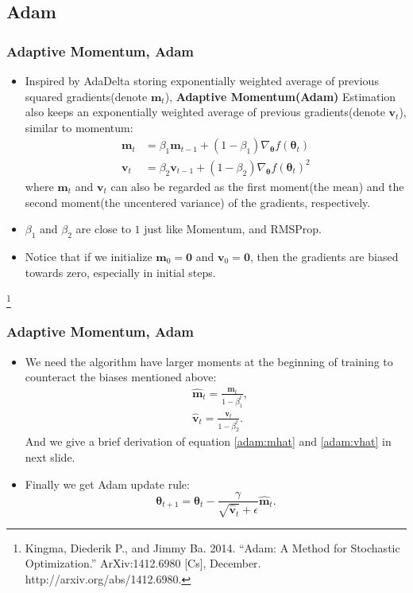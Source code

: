\documentclass[10pt]{beamer}
\theoremstyle{mystyle}
\def\bb#1{\mathbf{#1}}
\newcommand{\bst}{\boldsymbol\theta}
\newcommand\blfootnote[1]{%
  \begingroup
  \renewcommand\thefootnote{}\footnote[frame]{#1}%
  \addtocounter{footnote}{-1}%
  \endgroup
}
\theoremstyle{mystyle}
\begin{document}
\subsection{Adam}
\begin{frame}
	\frametitle{Adaptive Momentum, Adam}
	\begin{itemize}
		\item Inspired by AdaDelta storing exponentially weighted average of previous squared gradients(denote $\bb m_t$), {\bf Adaptive Momentum(Adam)} Estimation also keeps an exponentially weighted average of previous gradients(denote $\bb v_t$), similar to momentum:
		\begin{align}
			\bb m_t &= \beta_1\bb m_{t-1}+(1-\beta_1)\nabla_{\bst}f(\bst_t) \\
			\bb v_t &= \beta_2\bb v_{t-1}+(1-\beta_2)\nabla_{\bst}f(\bst_t)^2 
		\end{align}
		where $\bb m_t$ and $\bb v_t$ can also be regarded as the first moment(the mean) and the second moment(the uncentered variance) of the gradients, respectively. 
		\item $\beta_1$ and $\beta_2$ are close to $1$ just like Momentum, and RMSProp.
		\item Notice that if we initialize $\bb m_0=\bb0$ and $\bb v_0=\bb0$, then the gradients are biased towards zero, especially in initial steps.
	\end{itemize}
	
	\blfootnote{Kingma, Diederik P., and Jimmy Ba. 2014. “Adam: A Method for Stochastic Optimization.” ArXiv:1412.6980 [Cs], December. http://arxiv.org/abs/1412.6980.}
\end{frame}

\begin{frame}
	\frametitle{Adaptive Momentum, Adam}
	\begin{itemize}
		\item We need the algorithm have larger moments at the beginning of training to counteract the biases mentioned above:
		\begin{align}\label{adam:mhat}
			&\hat{\bb m}_t=\frac{\bb m_t}{1 - \beta_1^t}, \\ \label{adam:vhat}
			&\hat{\bb v}_t=\frac{\bb v_t}{1 - \beta_2^t}.
		\end{align}
		And we give a brief derivation of equation \eqref{adam:mhat} and \eqref{adam:vhat} in next slide.
		\item Finally we get Adam update rule:
		\begin{equation}
			\bst_{t+1}=\bst_t-\frac{\gamma}{\sqrt{\hat{\bb v}_t}+\epsilon}\hat{\bb m}_t.
		\end{equation}
	\end{itemize}
\end{frame}
\end{document}
